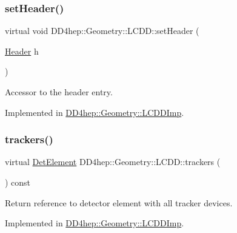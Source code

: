 \subsubsection{\texorpdfstring{set\+Header()}{setHeader()}}
{\footnotesize\ttfamily virtual void D\+D4hep\+::\+Geometry\+::\+L\+C\+D\+D\+::set\+Header (\begin{DoxyParamCaption}\item[{\hyperlink{class_d_d4hep_1_1_geometry_1_1_header}{Header}}]{h }\end{DoxyParamCaption})\hspace{0.3cm}{\ttfamily [pure virtual]}}



Accessor to the header entry. 



Implemented in \hyperlink{class_d_d4hep_1_1_geometry_1_1_l_c_d_d_imp_af37d163b4c62d1ef1602555d39e0eff8}{D\+D4hep\+::\+Geometry\+::\+L\+C\+D\+D\+Imp}.

\hypertarget{class_d_d4hep_1_1_geometry_1_1_l_c_d_d_a23b3868f3b09adccc62799612285c7db}{}\label{class_d_d4hep_1_1_geometry_1_1_l_c_d_d_a23b3868f3b09adccc62799612285c7db} 
\subsubsection{\texorpdfstring{trackers()}{trackers()}}
{\footnotesize\ttfamily virtual \hyperlink{class_d_d4hep_1_1_geometry_1_1_det_element}{Det\+Element} D\+D4hep\+::\+Geometry\+::\+L\+C\+D\+D\+::trackers (\begin{DoxyParamCaption}{ }\end{DoxyParamCaption}) const\hspace{0.3cm}{\ttfamily [pure virtual]}}



Return reference to detector element with all tracker devices. 



Implemented in \hyperlink{class_d_d4hep_1_1_geometry_1_1_l_c_d_d_imp_a49ddb87cd810770e46e5e97f8b861329}{D\+D4hep\+::\+Geometry\+::\+L\+C\+D\+D\+Imp}.

\hypertarget{class_d_d4hep_1_1_geometry_1_1_l_c_d_d_a351b289056485f960e9121382018c92b}{}\label{class_d_d4hep_1_1_geometry_1_1_l_c_d_d_a351b289056485f960e9121382018c92b} 

